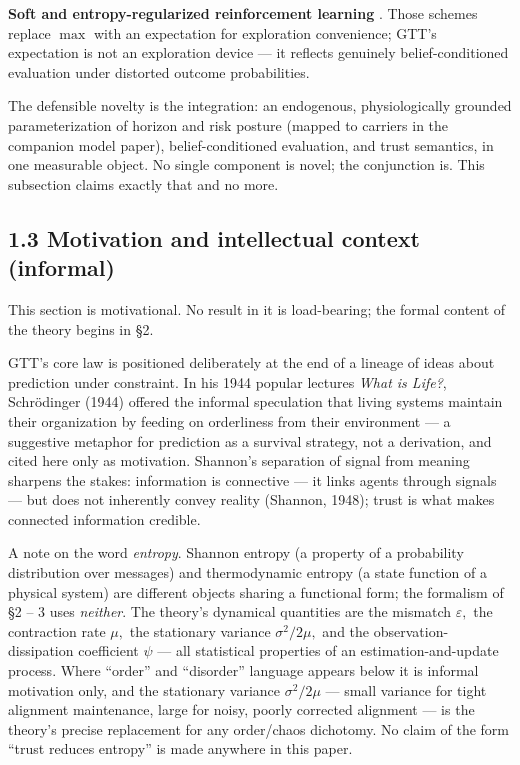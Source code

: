 \documentclass[
]{article}
\begin{document}
\textbf{Soft and entropy-regularized reinforcement learning} . Those
schemes replace \(\max\) with an expectation for exploration
convenience; GTT's expectation is not an exploration device --- it
reflects genuinely belief-conditioned evaluation under distorted outcome
probabilities.

The defensible novelty is the integration: an endogenous,
physiologically grounded parameterization of horizon and risk posture
(mapped to carriers in the companion model paper), belief-conditioned
evaluation, and trust semantics, in one measurable object. No single
component is novel; the conjunction is. This subsection claims exactly
that and no more.

\subsection{1.3 Motivation and intellectual context
(informal)}\label{motivation-and-intellectual-context-informal}

This section is motivational. No result in it is load-bearing; the
formal content of the theory begins in §2.

GTT's core law is positioned deliberately at the end of a lineage of
ideas about prediction under constraint. In his 1944 popular lectures
\emph{What is Life?}, Schrödinger (1944) offered the informal
speculation that living systems maintain their organization by feeding
on orderliness from their environment --- a suggestive metaphor for
prediction as a survival strategy, not a derivation, and cited here only
as motivation. Shannon's separation of signal from meaning sharpens the
stakes: information is connective --- it links agents through signals
--- but does not inherently convey reality (Shannon, 1948); trust is
what makes connected information credible.

A note on the word \emph{entropy}. Shannon entropy (a property of a
probability distribution over messages) and thermodynamic entropy (a
state function of a physical system) are different objects sharing a
functional form; the formalism of §2 -- 3 uses \emph{neither}. The
theory's dynamical quantities are the mismatch \(\varepsilon,\) the
contraction rate \(\mu,\) the stationary variance \(\sigma^{2}/2\mu,\)
and the observation-dissipation coefficient \(\psi\) --- all statistical
properties of an estimation-and-update process. Where ``order'' and
``disorder'' language appears below it is informal motivation only, and
the stationary variance \(\sigma^{2}/2\mu\) --- small variance for tight
alignment maintenance, large for noisy, poorly corrected alignment ---
is the theory's precise replacement for any order/chaos dichotomy. No
claim of the form ``trust reduces entropy'' is made anywhere in this
paper.
\end{document}
